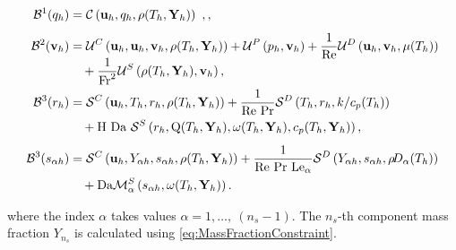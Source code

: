 \begin{subequations}
	\begin{align}%
		\mathcal{B}^1(q_h)
		 & = \ContDis\ ,,  \label{DiscretizedConti}                                                                                                                             \\[1ex]
		\mathcal{B}^2(\vec{v}_h)
		 & =	\MomConv + \MomPres + \frac{1}{\Reynolds}\MomDiff  \notag                                                                                                          \\
		 & \quad + \smash{\frac{1}{\Froude^2}}\MomSource, \label{DiscretizedMomentum}                                                                                           \\[1ex]
		\mathcal{B}^3(r_h)
		 & = \mathcal{S}^C\left(\vec{u}_h,T_h,r_h, \rhoh\right) + \frac{1}{\Reynolds~\Prandtl}\mathcal{S}^D\left(T_h,r_h,k/c_p(T_h)\right)  \notag                              \\
		 & \quad + \text{H}~\Da ~ \mathcal{S}^S\left(r_h, \heatRelease(T_h,\vec{Y}_h), \rateReac(T_h,\vec{Y}_h),\cph\right), \label{DiscretizedEnergy}                          \\[1ex]
		\mathcal{B}^3(s_{\alpha h})
		 & = \mathcal{S}^C\left(\vec{u}_h,\Yi, s_{\alpha h}, \rhoh\right) + \frac{1}{\Reynolds~\Prandtl~\Lewis_\alpha}\mathcal{S}^D\left(\Yi,s_{\alpha h},\rhodh\right)  \notag \\
		 & \quad + \Da \mathcal{M}^S_\alpha\left(s_{\alpha h},\rateReac(T_h,\vec{Y}_h )\right). \label{DiscretizedMassFractions}
	\end{align}\label{eqs:variatProblemFull}
\end{subequations}

where the index $\alpha$ takes values $\alpha = 1, \dots,~(n_s - 1)$. The $n_s$-th component mass fraction $Y_{n_s}$ is calculated using \cref{eq:MassFractionConstraint}.
